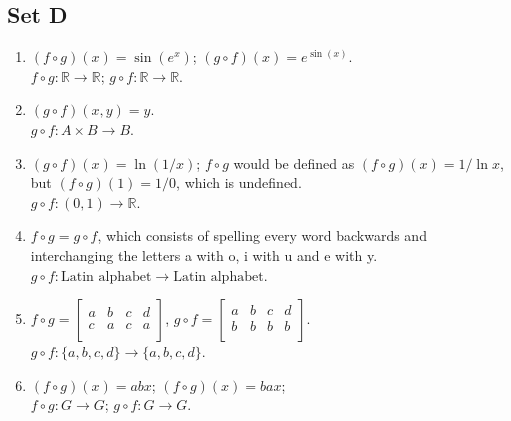 \documentclass{article}
\begin{document}
\subsection{Set D}
\begin{enumerate}
    \item $(f \circ g)(x) = \sin(e^x)$; $(g \circ f)(x) = e^{\sin(x)}$.\\
    $f \circ g: \mathbb{R} \to \mathbb{R}$; $g \circ f: \mathbb{R} \to \mathbb{R}$.

    \item $(g \circ f)(x, y) = y$.\\
    $g \circ f: A \times B \to B$.

    \item $(g \circ f)(x) = \ln(1/x)$; $f \circ g$ would be defined as $(f \circ g)(x) = 1/\ln x$, but $(f \circ g)(1) = 1/0$, which is undefined.\\
    $g \circ f: (0, 1) \to \mathbb{R}$.

    \item $f \circ g = g \circ f$, which consists of spelling every word backwards and interchanging the letters a with o, i with u and e with y.\\
    $g \circ f: \text{Latin alphabet} \to \text{Latin alphabet}$.

    \item $f \circ g = \begin{bmatrix}
        a & b & c & d \\
        c & a & c & a \\
    \end{bmatrix}$, 
    $g \circ f = \begin{bmatrix}
        a & b & c & d \\
        b & b & b & b \\
    \end{bmatrix}$.\\
    $g \circ f: \{a, b, c, d\} \to \{a, b, c, d\}$.

    \item $(f \circ g)(x) = abx$; $(f \circ g)(x) = bax$;\\
    $f \circ g: G \to G$; $g \circ f: G \to G$.
\end{enumerate}
\end{document}
